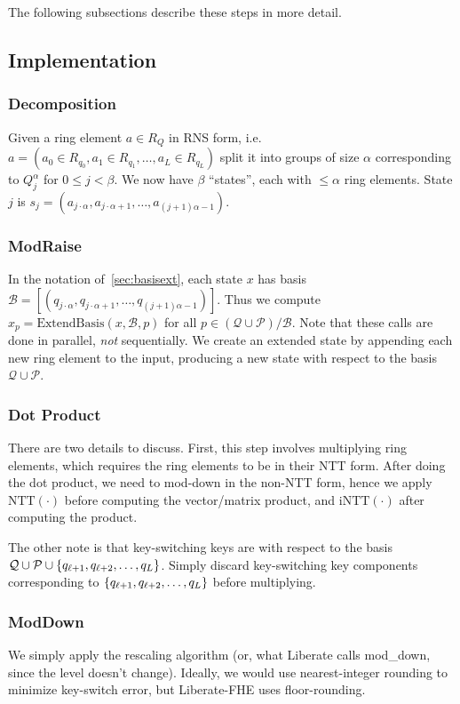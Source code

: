 \documentclass[../../fheimpl.tex]{subfiles}
\begin{document}
The following subsections describe these steps in more detail.

\subsection{Implementation}
\subsubsection{Decomposition}
Given a ring element $a \in R_{Q}$ in RNS form, i.e. $a = (a_0\in R_{q_0}, a_1\in R_{q_1}, \ldots, a_{L}\in R_{q_L})$ split it into groups of size $\alpha$ corresponding to $Q_j^\alpha$ for $0\le j< \beta$. We now have $\beta$ ``states'', each with $\le\alpha$ ring elements. State $j$ is $s_j=(a_{j\cdot\alpha}, a_{j\cdot\alpha + 1}, \ldots, a_{(j+1)\alpha-1})$.

\subsubsection{ModRaise}
In the notation of~\cref{sec:basisext}, each state $x$ has basis $\mathcal{B}=[(q_{j\cdot\alpha}, q_{j\cdot\alpha + 1}, \ldots, q_{(j+1)\alpha-1})]$. Thus we compute $x_p = \mathrm{ExtendBasis}(x, \mathcal{B}, p)$ for all $p \in (\mathcal{Q}\cup\mathcal{P}) / \mathcal{B}$. Note that these calls are done in parallel, \emph{not} sequentially. We create an extended state by appending each new ring element to the input, producing a new state with respect to the basis $\mathcal{Q}\cup\mathcal{P}$.

\subsubsection{Dot Product}
There are two details to discuss. First, this step involves multiplying ring elements, which requires the ring elements to be in their NTT form. After doing the dot product, we need to mod-down in the non-NTT form, hence we apply $\mathrm{NTT}(\cdot)$ before computing the vector/matrix product, and $\mathrm{iNTT}(\cdot)$ after computing the product.

The other note is that key-switching keys are with respect to the basis $\mathcal{Q}\cup\mathcal{P}\cup\{q_{\ell+1}, q_{\ell+2}, \ldots, q_L\}$. Simply discard key-switching key components corresponding to $\{q_{\ell+1}, q_{\ell+2}, \ldots, q_L\}$ before multiplying. 

\subsubsection{ModDown}
We simply apply the rescaling algorithm (or, what Liberate calls \textsf{mod\_down}, since the level doesn't change). Ideally, we would use nearest-integer rounding to minimize key-switch error, but Liberate-FHE uses floor-rounding.
\end{document}
